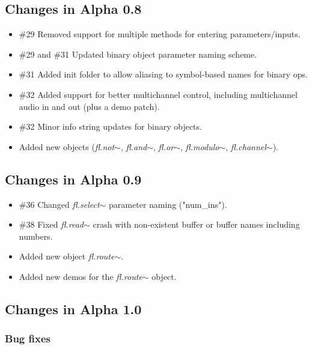\documentclass{article}
\newcommand{\flobject}[1]{\textit{fl.#1$\sim$}}
\begin{document}
\subsection{Changes in Alpha 0.8}
\vspace{0.1in}

\begin{itemize}
\item {\#29} Removed support for multiple methods for entering parameters/inputs.
\item {\#29} and {\#31} Updated binary object parameter naming scheme.
\item {\#31} Added init folder to allow aliasing to symbol-based names for binary ops.
\item {\#32} Added support for better multichannel control, including multichannel audio in and out (plus a demo patch).
\item {\#32} Minor info string updates for binary objects.
\item Added new objects (\flobject{not}, \flobject{and}, \flobject{or}, \flobject{modulo}, \flobject{channel}).
\end{itemize}

\subsection{Changes in Alpha 0.9}
\vspace{0.1in}

\begin{itemize}
\item {\#36} Changed \flobject{select} parameter naming ("num\_ins").
\item {\#38} Fixed \flobject{read} crash with non-existent buffer or buffer names including numbers.
\item Added new object \flobject{route}.
\item Added new demos for the \flobject{route} object.
\end{itemize}

\subsection{Changes in Alpha 1.0}
\vspace{0.1in}

\subsubsection{Bug fixes}
\end{document}
